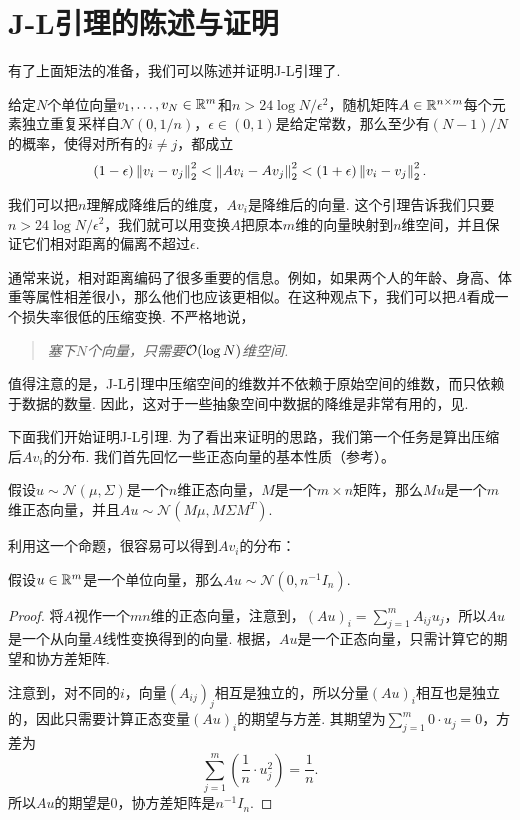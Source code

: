 \section{J-L引理的陈述与证明}
有了上面矩法的准备，我们可以陈述并证明J-L引理了.
\begin{theorem}\label{thm:johnson-lindenstrauss-lemma}
给定$N$个单位向量$v_1,\dots,v_N\in\mathbb{R}^m$和$n >24\log N/\epsilon^2$，随机矩阵$A\in \mathbb{R}^{n\times m}$每个元素独立重复采样自$\mathcal N(0,1/n)$，$\epsilon \in (0,1)$是给定常数，那么至少有$(N-1)/N$的概率，使得对所有的$i\neq j$，都成立
    \[
        (1 - \epsilon)\left\|v_i-v_j\right\|_2^2 <\left\|Av_i-Av_j\right\|_2^2 < (1 + \epsilon)\left\|v_i-v_j\right\|_2^2.
    \]
\end{theorem}

我们可以把$n$理解成降维后的维度，$Av_i$是降维后的向量. 这个引理告诉我们只要$n > 24\log N/\epsilon^2$，我们就可以用变换$A$把原本$m$维的向量映射到$n$维空间，并且保证它们相对距离的偏离不超过$\epsilon$.

通常来说，相对距离编码了很多重要的信息。例如，如果两个人的年龄、身高、体重等属性相差很小，那么他们也应该更相似。在这种观点下，我们可以把$A$看成一个损失率很低的压缩变换. 不严格地说，
\begin{quotation}
    \emph{塞下$N$个向量，只需要$\mathcal{O}(\log N)$维空间.}
\end{quotation}

值得注意的是，J-L引理中压缩空间的维数并不依赖于原始空间的维数，而只依赖于数据的数量. 因此，这对于一些抽象空间中数据的降维是非常有用的，见.

下面我们开始证明J-L引理. 为了看出来证明的思路，我们第一个任务是算出压缩后$Av_i$的分布. 我们首先回忆一些正态向量的基本性质（参考）。

\begin{proposition}\label{prop:gaussian-vector}
假设$u\sim\mathcal N(\mu,\Sigma)$是一个$n$维正态向量，$M$是一个$m\times n$矩阵，那么$Mu$是一个$m$维正态向量，并且$Au\sim \mathcal N(M\mu,M\Sigma M^T)$.
\end{proposition}

利用这一个命题，很容易可以得到$Av_i$的分布：

\begin{lemma}\label{lemma:gaussian-vector}
    假设$u\in\mathbb{R}^m$是一个单位向量，那么$Au\sim \mathcal N(0,n^{-1}I_n)$.
\end{lemma}
\begin{proof}
    将$A$视作一个$mn$维的正态向量，注意到，$(Au)_i = \sum_{j=1}^m A_{ij}u_j$，所以$Au$是一个从向量$A$线性变换得到的向量. 根据，$Au$是一个正态向量，只需计算它的期望和协方差矩阵. 
   
   注意到，对不同的$i$，向量$(A_{ij})_{j}$相互是独立的，所以分量$(Au)_i$相互也是独立的，因此只需要计算正态变量$(Au)_i$的期望与方差. 其期望为$\sum_{j=1}^m 0\cdot u_j = 0$，方差为
   \[\sum_{j=1}^m \left(\frac{1}{n}\cdot u_j^2\right) = \frac{1}{n}.\] 
   所以$Au$的期望是$0$，协方差矩阵是$n^{-1}I_n$.
\end{proof}

